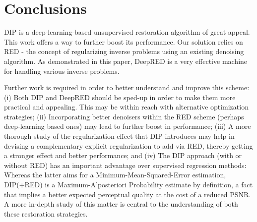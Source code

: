 \documentclass[12pt]{article}
\begin{document}
\section{Conclusions}
\label{sec:conclusions}

DIP is a deep-learning-based unsupervised restoration algorithm of great appeal. This work offers a way to further boost its performance. Our solution relies on RED - the concept of regularizing inverse problems using an existing denoising algorithm. As demonstrated in this paper, DeepRED is a very effective machine for handling various inverse problems. 

Further work is required in order to better understand and improve this scheme: (i) Both DIP and DeepRED should be sped-up in order to make them more practical and appealing. This may be within reach with alternative optimization strategies; (ii) Incorporating better denoisers within the RED scheme (perhaps deep-learning based ones) may lead to further boost in performance; (iii) A more thorough study of the regularization effect that DIP introduces may help in devising a complementary explicit regularization to add via RED, thereby getting a stronger effect and better performance; and 
(iv) The DIP approach (with or without RED) has an important advantage over supervised regression methods: Whereas the latter aims for a Minimum-Mean-Squared-Error estimation, DIP(+RED) is a Maximum-A’posteriori Probability estimate by definition, a fact that implies a better expected perceptual quality at the cost of a reduced PSNR. A more in-depth study of this matter is central to the understanding of both these restoration strategies. 

  

\end{document}

